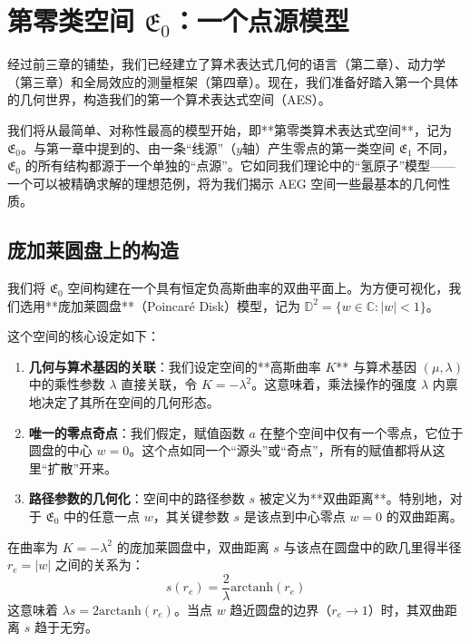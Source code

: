 \documentclass[a4paper,12pt]{book}
\numberwithin{problem}{section}
\numberwithin{definition}{section}
\numberwithin{lemma}{section}
\numberwithin{proposition}{section}
\numberwithin{theorem}{section}
\numberwithin{grammar}{section}
\numberwithin{program}{section}
\numberwithin{convention}{section}
\numberwithin{corollary}{section}
\begin{document}
\chapter{第零类空间 \texorpdfstring{$\mathfrak{E}_0$}{E0}：一个点源模型}
\label{chap:space_e0}

经过前三章的铺垫，我们已经建立了算术表达式几何的语言（第二章）、动力学（第三章）和全局效应的测量框架（第四章）。现在，我们准备好踏入第一个具体的几何世界，构造我们的第一个算术表达式空间（AES）。

我们将从最简单、对称性最高的模型开始，即**第零类算术表达式空间**，记为 $\mathfrak{E}_0$。与第一章中提到的、由一条“线源”（$y$轴）产生零点的第一类空间 $\mathfrak{E}_1$ 不同，$\mathfrak{E}_0$ 的所有结构都源于一个单独的“点源”。它如同我们理论中的“氢原子”模型——一个可以被精确求解的理想范例，将为我们揭示 AEG 空间一些最基本的几何性质。

\section{庞加莱圆盘上的构造}
\label{sec:e0_construction}

我们将 $\mathfrak{E}_0$ 空间构建在一个具有恒定负高斯曲率的双曲平面上。为方便可视化，我们选用**庞加莱圆盘**（Poincaré Disk）模型，记为 $\mathbb{D}^2 = \{w \in \mathbb{C} : |w| < 1 \}$。

这个空间的核心设定如下：
\begin{enumerate}
    \item \textbf{几何与算术基因的关联}：我们设定空间的**高斯曲率 $K$** 与算术基因 $(\mu, \lambda)$ 中的乘性参数 $\lambda$ 直接关联，令 $K = -\lambda^2$。这意味着，乘法操作的强度 $\lambda$ 内禀地决定了其所在空间的几何形态。
    \item \textbf{唯一的零点奇点}：我们假定，赋值函数 $a$ 在整个空间中仅有一个零点，它位于圆盘的中心 $w=0$。这个点如同一个“源头”或“奇点”，所有的赋值都将从这里“扩散”开来。
    \item \textbf{路径参数的几何化}：空间中的路径参数 $s$ 被定义为**双曲距离**。特别地，对于 $\mathfrak{E}_0$ 中的任意一点 $w$，其关键参数 $s$ 是该点到中心零点 $w=0$ 的双曲距离。
\end{enumerate}
在曲率为 $K=-\lambda^2$ 的庞加莱圆盘中，双曲距离 $s$ 与该点在圆盘中的欧几里得半径 $r_e = |w|$ 之间的关系为：
\begin{equation}
    s(r_e) = \frac{2}{\lambda} \text{arctanh}(r_e)
    \label{eq:hyperbolic_distance_s}
\end{equation}
这意味着 $\lambda s = 2 \text{arctanh}(r_e)$。当点 $w$ 趋近圆盘的边界（$r_e \to 1$）时，其双曲距离 $s$ 趋于无穷。
\end{document}
